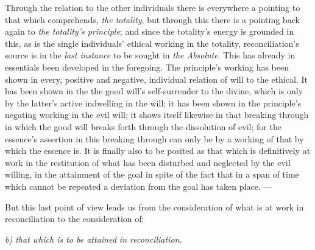 \documentclass[12pt,a4paper]{book}
\begin{document}
Through the relation to the other individuals there is everywhere a pointing to
that which comprehends, \emph{the totality}, but
through this there is a pointing back again to \emph{the totality's principle};
and since the totality's energy is grounded in this, as is the single
individuals' ethical working in the totality, reconciliation's source is in the
\emph{last instance} to be sought in \emph{the Absolute}. This has already in
essentials been developed in the foregoing. The principle's working has been
shown in every, positive and negative, individual relation of will to the
ethical. It has been shown in the the good will's self-surrender to the divine,
which is only by the latter's active indwelling in the will; it has been shown
in the principle's negating working in the evil will; it shows itself likewise
in that breaking through in which the good will breaks forth through the
dissolution of evil; for the essence's assertion in this breaking through can
only be by a working of that by which the essence is. It is finally also to be
posited as that which is definitively at work in the restitution of what has
been disturbed and neglected by the evil willing, in the attainment of the goal
in spite of the fact that in a span of time which cannot be repeated a deviation
from the goal has taken place. ---

But this last point of view leads us from the consideration of what is at work
in reconciliation to the consideration of:

\begin{center}
\emph{b) that which is to be attained in reconciliation.}
\end{center}
\end{document}
